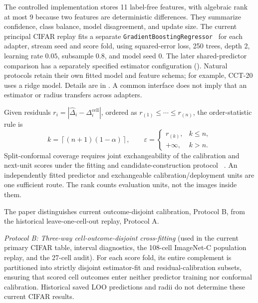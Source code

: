 The controlled implementation stores 11 label-free features, with algebraic rank at most 9 because two
features are deterministic differences. They summarize confidence, class balance, model
disagreement, and update size. The current principal CIFAR replay fits a separate
\texttt{GradientBoostingRegressor}~\cite{pedregosa2011sklearn} for each adapter, stream seed and score fold,
using squared-error loss, 250 trees, depth 2, learning rate $0.05$, subsample $0.8$, and model seed 0.
The later shared-predictor comparison has a separately specified estimator configuration
().
Natural protocols retain their own fitted model and feature schema; for example, CCT-20 uses a
ridge model. Details are in . A common interface does not imply
that an estimator or radius transfers across adapters.

Given residuals $r_i=|\widehat\Delta_i-\Delta_i^{\mathrm{cell}}|$, ordered as
$r_{(1)}\le\cdots\le r_{(n)}$, the order-statistic rule is
\begin{equation}
 k=\left\lceil(n+1)(1-\alpha)\right\rceil,\qquad
 \varepsilon=
 \begin{cases}
 r_{(k)},&k\le n,\\
 +\infty,&k>n.
 \end{cases}
 \label{eq:compact-rank}
\end{equation}
Split-conformal coverage requires joint exchangeability of the calibration and next-unit scores
under the fitting and candidate-construction protocol
~\cite{tibshirani2019conformal,barber2023beyond}. An independently fitted predictor and exchangeable
calibration/deployment units are one sufficient route. The rank counts evaluation units, not the
images inside them.

The paper distinguishes current outcome-disjoint calibration, Protocol B, from the historical leave-one-cell-out replay, Protocol A.

\emph{Protocol B: Three-way cell-outcome-disjoint cross-fitting} (used in the current primary CIFAR table, interval diagnostics, the 108-cell ImageNet-C population replay, and the  27-cell audit). For each score fold, its entire complement is partitioned into strictly disjoint estimator-fit and residual-calibration subsets, ensuring that scored cell outcomes enter neither predictor training nor conformal calibration. Historical saved LOO predictions and radii do not determine these current CIFAR results.


